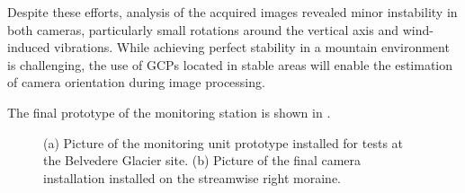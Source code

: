 Despite these efforts, analysis of the acquired images revealed minor instability in both cameras, particularly small rotations around the vertical axis and wind-induced vibrations. 
While achieving perfect stability in a mountain environment is challenging, the use of GCPs located in stable areas will enable the estimation of camera orientation during image processing.

The final prototype of the monitoring station is shown in .

\begin{figure}[ht!]
  \centering
   \quad
  \caption{(a) Picture of the monitoring unit prototype installed for tests at the Belvedere Glacier site. (b) Picture of the final camera installation installed on the streamwise right moraine.}
  \label{fig:4:final_installation}
\end{figure}

